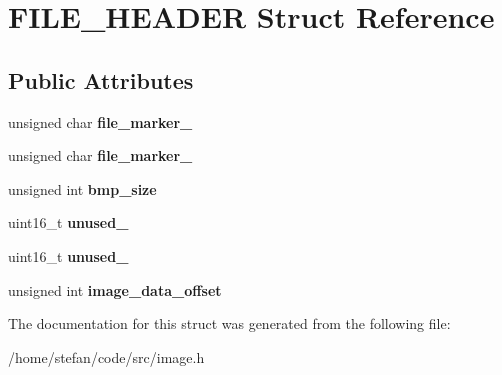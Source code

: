 \hypertarget{structFILE__HEADER}{}\section{F\+I\+L\+E\+\_\+\+H\+E\+A\+D\+ER Struct Reference}
\label{structFILE__HEADER}
\subsection*{Public Attributes}
\begin{DoxyCompactItemize}
\item 
\mbox{\label{structFILE__HEADER_a87a2e43db9fc4cb5f1782dd539327d2a}} 
unsigned char {\bfseries file\+\_\+marker\+\_}
\item 
\mbox{\label{structFILE__HEADER_a0073086bf9262ebecb2a4f022f8d387f}} 
unsigned char {\bfseries file\+\_\+marker\+\_}
\item 
\mbox{\label{structFILE__HEADER_a9df02fc8a52cb63992b422379d5e4877}} 
unsigned int {\bfseries bmp\+\_\+size}
\item 
\mbox{\label{structFILE__HEADER_a18a5fdd9aeb02a9077d2526d1552acd7}} 
uint16\+\_\+t {\bfseries unused\+\_}
\item 
\mbox{\label{structFILE__HEADER_ae4b87e7b4dcf63b1229c0f435e7e0785}} 
uint16\+\_\+t {\bfseries unused\+\_}
\item 
\mbox{\label{structFILE__HEADER_a696299b90d97e4d990f72454a42b7ef1}} 
unsigned int {\bfseries image\+\_\+data\+\_\+offset}
\end{DoxyCompactItemize}


The documentation for this struct was generated from the following file\+:\begin{DoxyCompactItemize}
\item 
/home/stefan/code/src/image.\+h\end{DoxyCompactItemize}
